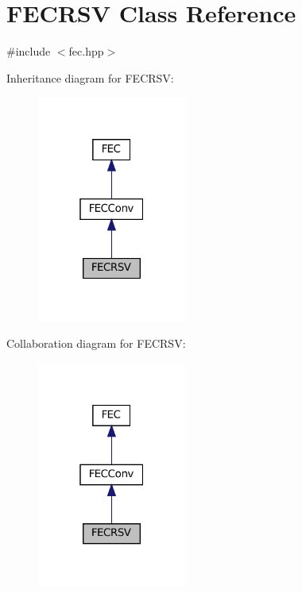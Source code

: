 \hypertarget{classFECRSV}{}\section{F\+E\+C\+R\+SV Class Reference}
\label{classFECRSV}


{\ttfamily \#include $<$fec.\+hpp$>$}



Inheritance diagram for F\+E\+C\+R\+SV\+:\nopagebreak
\begin{figure}[H]
\begin{center}
\leavevmode
\includegraphics[width=139pt]{classFECRSV__inherit__graph}
\end{center}
\end{figure}


Collaboration diagram for F\+E\+C\+R\+SV\+:\nopagebreak
\begin{figure}[H]
\begin{center}
\leavevmode
\includegraphics[width=139pt]{classFECRSV__coll__graph}
\end{center}
\end{figure}
